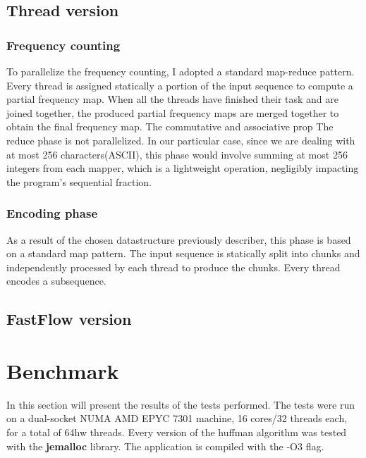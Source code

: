 \documentclass{report}
\begin{document}
\section{Thread version}
\subsection{Frequency counting}
To parallelize the frequency counting, I adopted a standard
map-reduce pattern. Every thread is assigned statically a portion of
the input sequence to compute a partial frequency map.
When all the threads have finished their task and are joined together,
the produced partial frequency maps are merged together to obtain the final
frequency map. The commutative and associative
prop
The reduce phase is not parallelized.
In our particular case, since we are dealing with at most 256 characters(ASCII),
this phase would involve summing at most 256 integers from
each mapper, which is a lightweight operation, negligibly impacting the program's
sequential fraction.
\subsection{Encoding phase}
As a result of the chosen datastructure
previously describer, this phase is based on a standard map pattern.
The input sequence is statically split into chunks and
independently processed by each thread to produce the chunks. Every
thread encodes a subsequence.


\section{FastFlow version}

\chapter{Benchmark}
In this section will present the results of the tests performed.
The tests were run on a dual-socket
NUMA AMD EPYC 7301 machine, 16 cores/32 threads each, for a total of 64hw
threads.
Every version of the huffman algorithm was tested with the \textbf{jemalloc} library.
The application is compiled with the -O3 flag.
\end{document}
